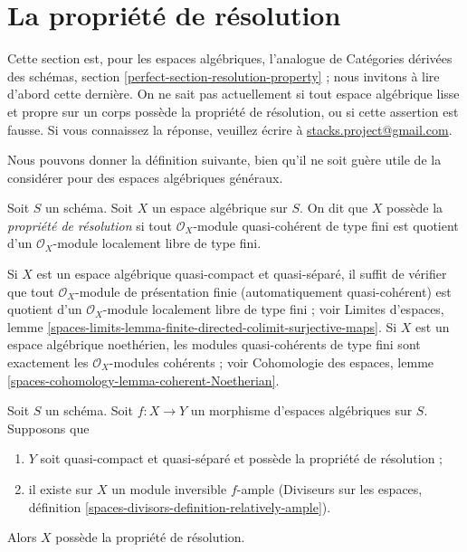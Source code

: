 \section{La propri\'et\'e de r\'esolution}
\label{section-resolution-property}

\noindent
Cette section est, pour les espaces alg\'ebriques, l'analogue de Cat\'egories
d\'eriv\'ees des sch\'emas, section
\ref{perfect-section-resolution-property} ; nous invitons \`a lire d'abord
cette derni\`ere. On ne sait pas actuellement si tout espace alg\'ebrique lisse
et propre sur un corps poss\`ede la propri\'et\'e de r\'esolution, ou si cette
assertion est fausse. Si vous connaissez la r\'eponse, veuillez \'ecrire \`a
\href{mailto:stacks.project@gmail.com}{stacks.project@gmail.com}.

\medskip\noindent
Nous pouvons donner la d\'efinition suivante, bien qu'il ne soit gu\`ere utile
de la consid\'erer pour des espaces alg\'ebriques g\'en\'eraux.

\begin{definition}
\label{definition-resolution-property}
Soit $S$ un sch\'ema. Soit $X$ un espace alg\'ebrique sur $S$.
On dit que $X$ poss\`ede la {\it propri\'et\'e de r\'esolution} si tout
$\mathcal{O}_X$-module quasi-coh\'erent de type fini est quotient d'un
$\mathcal{O}_X$-module localement libre de type fini.
\end{definition}

\noindent
Si $X$ est un espace alg\'ebrique quasi-compact et quasi-s\'epar\'e, il suffit de
v\'erifier que tout $\mathcal{O}_X$-module de pr\'esentation finie
(automatiquement quasi-coh\'erent) est quotient d'un $\mathcal{O}_X$-module
localement libre de type fini ; voir Limites d'espaces, lemme
\ref{spaces-limits-lemma-finite-directed-colimit-surjective-maps}.
Si $X$ est un espace alg\'ebrique noeth\'erien, les modules quasi-coh\'erents de
type fini sont exactement les $\mathcal{O}_X$-modules coh\'erents ; voir
Cohomologie des espaces, lemme
\ref{spaces-cohomology-lemma-coherent-Noetherian}.

\begin{lemma}
\label{lemma-resolution-property-ample-relative}
Soit $S$ un sch\'ema.
Soit $f:X\to Y$ un morphisme d'espaces alg\'ebriques sur $S$. Supposons que
\begin{enumerate}
\item $Y$ soit quasi-compact et quasi-s\'epar\'e et poss\`ede la propri\'et\'e de
r\'esolution ;
\item il existe sur $X$ un module inversible $f$-ample (Diviseurs sur les
espaces, d\'efinition
\ref{spaces-divisors-definition-relatively-ample}).
\end{enumerate}
Alors $X$ poss\`ede la propri\'et\'e de r\'esolution.
\end{lemma}

